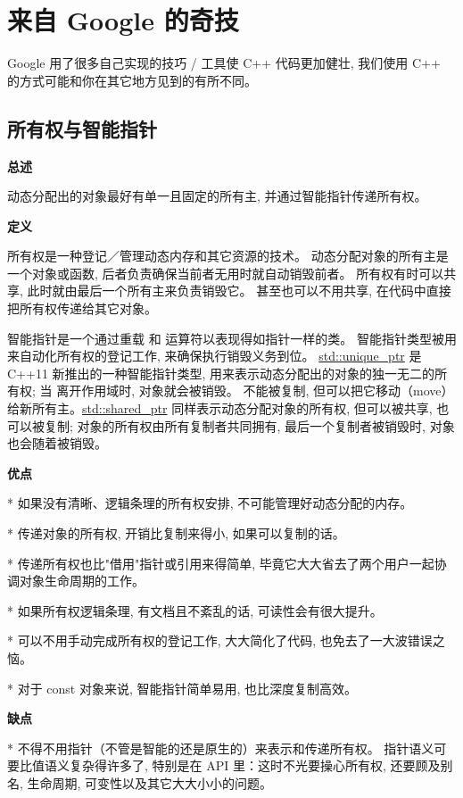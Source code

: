 \chapter{来自 Google 的奇技}

Google 用了很多自己实现的技巧 / 工具使 C++ 代码更加健壮, 我们使用 C++ 的方式可能和你在其它地方见到的有所不同。

\section{所有权与智能指针}

\textbf{ 总述}

动态分配出的对象最好有单一且固定的所有主, 并通过智能指针传递所有权。

\textbf{ 定义}

所有权是一种登记／管理动态内存和其它资源的技术。 动态分配对象的所有主是一个对象或函数, 后者负责确保当前者无用时就自动销毁前者。 所有权有时可以共享, 此时就由最后一个所有主来负责销毁它。 甚至也可以不用共享, 在代码中直接把所有权传递给其它对象。

智能指针是一个通过重载 \cppinline{*} 和 \cppinline{->} 运算符以表现得如指针一样的类。 智能指针类型被用来自动化所有权的登记工作, 来确保执行销毁义务到位。
\href{http://en.cppreference.com/w/cpp/memory/unique_ptr}{std::unique\_ptr} 是 C++11 新推出的一种智能指针类型, 用来表示动态分配出的对象的独一无二的所有权; 当  离开作用域时, 对象就会被销毁。  不能被复制, 但可以把它移动（move）给新所有主。\href{http://en.cppreference.com/w/cpp/memory/shared_ptr}{std::shared\_ptr} 同样表示动态分配对象的所有权, 但可以被共享, 也可以被复制; 对象的所有权由所有复制者共同拥有, 最后一个复制者被销毁时, 对象也会随着被销毁。

\textbf{ 优点}

* 如果没有清晰、逻辑条理的所有权安排, 不可能管理好动态分配的内存。

* 传递对象的所有权, 开销比复制来得小, 如果可以复制的话。

* 传递所有权也比"借用"指针或引用来得简单, 毕竟它大大省去了两个用户一起协调对象生命周期的工作。

* 如果所有权逻辑条理, 有文档且不紊乱的话, 可读性会有很大提升。

* 可以不用手动完成所有权的登记工作, 大大简化了代码, 也免去了一大波错误之恼。

* 对于 const 对象来说, 智能指针简单易用, 也比深度复制高效。

\textbf{ 缺点}

* 不得不用指针（不管是智能的还是原生的）来表示和传递所有权。 指针语义可要比值语义复杂得许多了, 特别是在 API 里：这时不光要操心所有权, 还要顾及别名, 生命周期, 可变性以及其它大大小小的问题。

